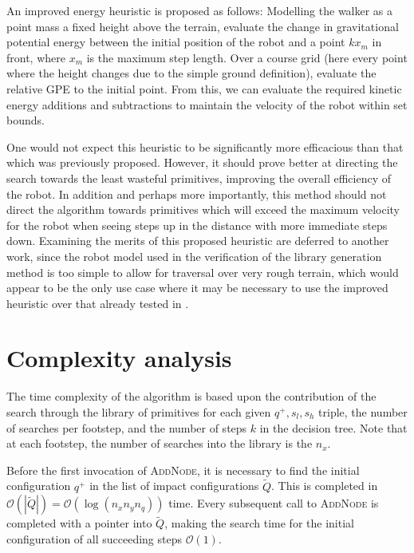 An improved energy heuristic is proposed as follows: Modelling the walker as a point mass a fixed height above the terrain, evaluate the change in gravitational potential energy between the initial position of the robot and a point $kx_m$ in front, where $x_m$ is the maximum step length. Over a course grid (here every point where the height changes due to the simple ground definition), evaluate the relative GPE to the initial point. From this, we can evaluate the required kinetic energy additions and subtractions to maintain the velocity of the robot within set bounds.
	
One would not expect this heuristic to be significantly more efficacious than that which was previously proposed. However, it should prove better at directing the search towards the least wasteful primitives, improving the overall efficiency of the robot. In addition and perhaps more importantly, this method should not direct the algorithm towards primitives which will exceed the maximum velocity for the robot when seeing steps up in the distance with more immediate steps down. Examining the merits of this proposed heuristic are deferred to another work, since the robot model used in the verification of the library generation method is too simple to allow for traversal over very rough terrain, which would appear to be the only use case where it may be necessary to use the improved heuristic over that already tested in \cite{manchester13planning}.

\section{Complexity analysis} \label{sec:complexity}
The time complexity of the algorithm is based upon the contribution of the search through the library of primitives for each given $q^+,s_l,s_h$ triple, the number of searches per footstep, and the number of steps $k$ in the decision tree. Note that at each footstep, the number of searches into the library is the $n_x$.

Before the first invocation of \textsc{AddNode}, it is necessary to find the initial configuration $q^+$ in the list of impact configurations $\tilde{Q}$. This is completed in $\mathcal{O}(|\tilde{Q}|)=\mathcal{O}(\log(n_xn_yn_q))$ time. Every subsequent call to \textsc{AddNode} is completed with a pointer into $\tilde{Q}$, making the search time for the initial configuration of all succeeding steps $\mathcal{O}(1)$.

